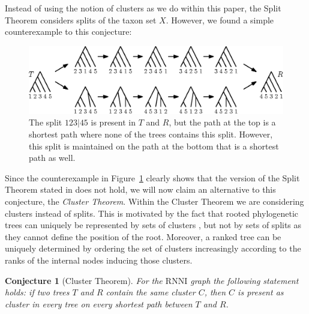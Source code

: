 \documentclass{amsart}
\newcommand{\rnni}{\mathrm{RNNI}}
\newtheorem{conjecture}[definition]{Conjecture}
\begin{document}
Instead of using the notion of clusters as we do within this paper, the Split Theorem considers splits of the taxon set $X$.
However, we found a simple counterexample to this conjecture:

\begin{figure}[H]
	\centering
	\includegraphics[width=\textwidth]{splitthm_counterexample}
	\caption{The split $123|45$ is present in $T$ and $R$, but the path at the top is a shortest path where none of the trees contains this split.
    However, this split is maintained on the path at the bottom that is a shortest path as well.}
	\label{splitthm_counterexample}
\end{figure}

Since the counterexample in Figure~\ref{splitthm_counterexample} clearly shows that the version of the Split Theorem stated in \autocite{Gavryushkin2017} does not hold, we will now claim an alternative to this conjecture, the \emph{Cluster Theorem}.
Within the Cluster Theorem we are considering clusters instead of splits.
This is motivated by the fact that rooted phylogenetic trees can uniquely be represented by sets of clusters \autocite{steel2016}, but not by sets of splits as they cannot define the position of the root.
Moreover, a ranked tree can be uniquely determined by ordering the set of clusters increasingly according to the ranks of the internal nodes inducing those clusters.

%
%

\begin{conjecture}[Cluster Theorem]
	For the $\rnni$ graph the following statement holds:
	if two trees $T$ and $R$ contain the same cluster $C$, then $C$ is present as cluster in every tree on every shortest path between $T$ and $R$.
	\label{cluster_theorem}
\end{conjecture}
\end{document}
